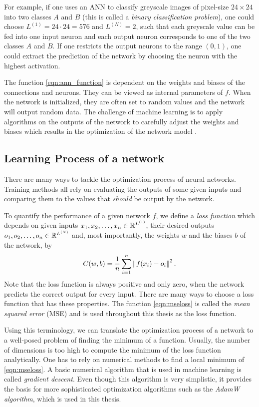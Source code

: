 For example, if one uses an ANN to classify greyscale images of pixel-size $24\times 24$ into two classes $A$ and $B$ (this is called a \textit{binary classification problem}), one could choose $L^{(1)} = 24 \cdot 24 = 576$ and $L^{(N)} = 2$, such that each greyscale value can be fed into one input neuron and each output neuron corresponds to one of the two classes $A$ and $B$. If one restricts the output neurons to the range $(0, 1)$, one could extract the prediction of the network by choosing the neuron with the highest activation.

The function \eqref{eqn:ann_function} is dependent on the weights and biases of the connections and neurons. They can be viewed as internal parameters of $f$. When the network is initialized, they are often set to random values and the network will output random data. The challenge of machine learning is to apply algorithms on the outputs of the network to carefully adjust the weights and biases which results in the optimization of the network model \cite{nielsen}.

\subsection{Learning Process of a network}
\label{sec:sgd}
There are many ways to tackle the optimization process of neural networks. Training methods all rely on evaluating the outputs of some given inputs and comparing them to the values that \textit{should} be output by the network.

To quantify the performance of a given network $f$, we define a \textit{loss function} which depends on given inputs $x_1, x_2, \dots, x_n \in \mathbb{R}^{L^{(1)}}$, their desired outputs $o_1, o_2, \dots, o_n \in \mathbb{R}^{L^{(N)}}$ and, most importantly, the weights $w$ and the biases $b$ of the network, by
\begin{equation}
  \label{eqn:mseloss}
  C(w, b) = \frac{1}{n}\sum_{i=1}^{n}\left\lVert f(x_i)-o_i\right\rVert^2.
\end{equation}
Note that the loss function is always positive and only zero, when the network predicts the correct output for every input. There are many ways to choose a loss function that has these properties. The function \eqref{eqn:mseloss} is called the \textit{mean squared error} (MSE) and is used throughout this thesis as the loss function.

Using this terminology, we can translate the optimization process of a network to a well-posed problem of finding the minimum of a function. Usually, the number of dimensions is too high to compute the minimum of the loss function analytically. One has to rely on numerical methods to find a local minimum of \eqref{eqn:mseloss}. A basic numerical algorithm that is used in machine learning is called \textit{gradient descent}. Even though this algorithm is very simplistic, it provides the basis for more sophisticated optimization algorithms such as the \textit{AdamW algorithm}, which is used in this thesis.

